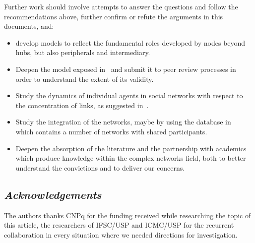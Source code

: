\documentclass[12pt,fleqn]{article}
\begin{document}
Further work should involve attempts to answer the questions and follow the recommendations above,
further confirm or refute the arguments in this documents, and:
\begin{itemize}
	\item develop models to reflect the fundamental roles developed by nodes beyond hubs, but also
		peripherals and intermediary.
	\item Deepen the model exposed in~\cite{fabbri3} and submit it to peer review processes in order
		to understand the extent of its validity.
	\item Study the dynamics of individual agents in social networks with respect to the concentration of links,
		as suggested in~\cite{fabbri1,fabbri2,versinus}.
	\item Study the integration of the networks, maybe by using the database in~\cite{losd} which
		contains a number of networks with shared participants.
	\item Deepen the absorption of the literature and the partnership with academics which produce
		knowledge within the complex networks field, both to better understand the convictions
		and to deliver our concerns.
\end{itemize}

\subsection*{\textit{Acknowledgements}}
The authors thanks CNPq for the funding received while researching the topic of this article,
the researchers of IFSC/USP and ICMC/USP for the recurrent collaboration in every situation
where we needed directions for investigation.
\end{document}
